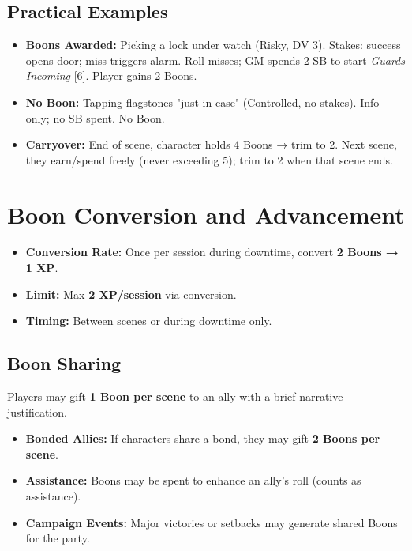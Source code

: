 \subsection{Practical Examples}
\label{subsec:boon-examples}
\begin{itemize}
\item \textbf{Boons Awarded:} Picking a lock under watch (Risky, DV 3). Stakes: success opens door; miss triggers alarm. Roll misses; GM spends 2 SB to start \emph{Guards Incoming} [6]. Player gains 2 Boons.
\item \textbf{No Boon:} Tapping flagstones "just in case" (Controlled, no stakes). Info-only; no SB spent. No Boon.
\item \textbf{Carryover:} End of scene, character holds 4 Boons → trim to 2. Next scene, they earn/spend freely (never exceeding 5); trim to 2 when that scene ends.
\end{itemize}

\section{Boon Conversion and Advancement}
\label{sec:boon-conversion}
\begin{itemize}
\item \textbf{Conversion Rate:} Once per session during downtime, convert \textbf{2 Boons → 1 XP}. 
\item \textbf{Limit:} Max \textbf{2 XP/session} via conversion. 
\item \textbf{Timing:} Between scenes or during downtime only. 
\end{itemize}

\subsection{Boon Sharing}

Players may gift \textbf{1 Boon per scene} to an ally with a brief narrative justification.  
\begin{itemize}
  \item \textbf{Bonded Allies:} If characters share a bond, they may gift \textbf{2 Boons per scene}.  
  \item \textbf{Assistance:} Boons may be spent to enhance an ally’s roll (counts as assistance).  
  \item \textbf{Campaign Events:} Major victories or setbacks may generate shared Boons for the party.  
\end{itemize}

